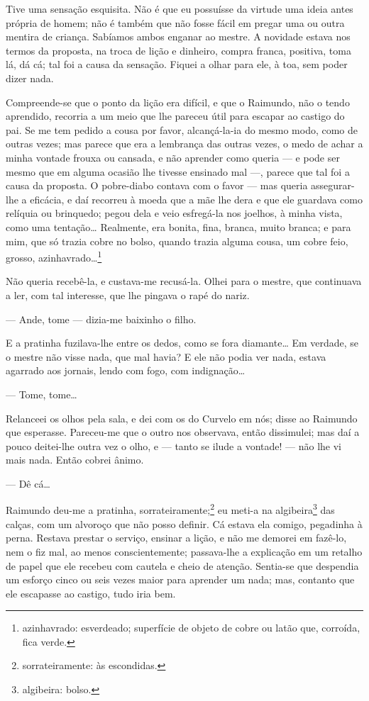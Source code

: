 Tive uma sensação esquisita. Não é que eu possuísse da virtude uma ideia
antes própria de homem; não é também que não fosse fácil em pregar uma
ou outra mentira de criança. Sabíamos ambos enganar ao mestre. A
novidade estava nos termos da proposta, na troca de lição e dinheiro,
compra franca, positiva, toma lá, dá cá; tal foi a causa da sensação.
Fiquei a olhar para ele, à toa, sem poder dizer nada.

Compreende-se que o ponto da lição era difícil, e que o Raimundo, não o
tendo aprendido, recorria a um meio que lhe pareceu útil para escapar ao
castigo do pai. Se me tem pedido a cousa por favor, alcançá-la-ia do
mesmo modo, como de outras vezes; mas parece que era a lembrança das
outras vezes, o medo de achar a minha vontade frouxa ou cansada, e não
aprender como queria --- e pode ser mesmo que em alguma ocasião lhe
tivesse ensinado mal ---, parece que tal foi a causa da proposta. O
pobre-diabo contava com o favor --- mas queria assegurar-lhe a eficácia,
e daí recorreu à moeda que a mãe lhe dera e que ele guardava como
relíquia ou brinquedo; pegou dela e veio esfregá-la nos joelhos, à minha
vista, como uma tentação\ldots{} Realmente, era bonita, fina, branca, muito
branca; e para mim, que só trazia cobre no bolso, quando trazia alguma
cousa, um cobre feio, grosso, azinhavrado\ldots{}\footnote{azinhavrado:
  esverdeado; superfície de objeto de cobre ou latão que, corroída, fica
  verde.}

Não queria recebê-la, e custava-me recusá-la. Olhei para o mestre, que
continuava a ler, com tal interesse, que lhe pingava o rapé do nariz.

--- Ande, tome --- dizia-me baixinho o filho.

E a pratinha fuzilava-lhe entre os dedos, como se fora diamante\ldots{} Em
verdade, se o mestre não visse nada, que mal havia? E ele não podia ver
nada, estava agarrado aos jornais, lendo com fogo, com indignação\ldots{}

--- Tome, tome\ldots{}

Relanceei os olhos pela sala, e dei com os do Curvelo em nós; disse ao
Raimundo que esperasse. Pareceu-me que o outro nos observava, então
dissimulei; mas daí a pouco deitei-lhe outra vez o olho, e --- tanto se
ilude a vontade! --- não lhe vi mais nada. Então cobrei ânimo.

--- Dê cá\ldots{}

Raimundo deu-me a pratinha, sorrateiramente;\footnote{sorrateiramente:
  às escondidas.} eu meti-a na algibeira\footnote{algibeira: bolso.} das
calças, com um alvoroço que não posso definir. Cá estava ela comigo,
pegadinha à perna. Restava prestar o serviço, ensinar a lição, e não me
demorei em fazê-lo, nem o fiz mal, ao menos conscientemente; passava-lhe
a explicação em um retalho de papel que ele recebeu com cautela e cheio
de atenção. Sentia-se que despendia um esforço cinco ou seis vezes maior
para aprender um nada; mas, contanto que ele escapasse ao castigo, tudo
iria bem.

